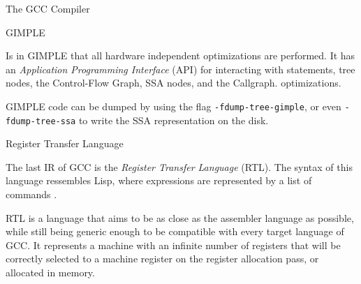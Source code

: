 \begin{section}{The GCC Compiler}
\begin{subsection}{GIMPLE}

	Is in GIMPLE that all hardware independent optimizations are performed. It
has an \textit{Application Programming Interface} (API) for interacting with
statements, tree nodes, the Control-Flow Graph, SSA nodes, and the Callgraph.
optimizations.

	GIMPLE code can be dumped by using the flag \texttt{-fdump-tree-gimple},
	or even \texttt{-fdump-tree-ssa} to write the SSA representation on the
	disk.

\end{subsection}

\begin{subsection}{Register Transfer Language}

	The last IR of GCC is the \textit{Register Transfer Language} (RTL).
	The syntax of this language ressembles Lisp, where expressions
	are represented by a list of commands \citep{rtl}.



	RTL is a language that aims to be as close as the assembler language
	as possible, while still being generic enough to be compatible with
	every target language of GCC. It represents a machine with an infinite
	number of registers that will be correctly selected to a machine
	register on the register allocation pass, or allocated in memory.



\end{subsection}
\end{section}
